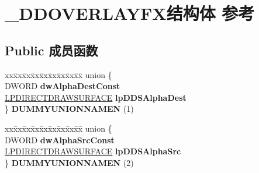 \hypertarget{struct___d_d_o_v_e_r_l_a_y_f_x}{}\section{\+\_\+\+D\+D\+O\+V\+E\+R\+L\+A\+Y\+F\+X结构体 参考}
\label{struct___d_d_o_v_e_r_l_a_y_f_x}
\subsection*{Public 成员函数}
\begin{DoxyCompactItemize}
\item 
\mbox{\label{struct___d_d_o_v_e_r_l_a_y_f_x_a41746edd5a33cf3b72858abd52d56ea8}} 
\begin{tabbing}
xx\=xx\=xx\=xx\=xx\=xx\=xx\=xx\=xx\=\kill
union \{\\
\>DWORD {\bfseries dwAlphaDestConst}\\
\>\hyperlink{interfacevoid}{LPDIRECTDRAWSURFACE} {\bfseries lpDDSAlphaDest}\\
\} {\bfseries DUMMYUNIONNAMEN} (1)\\

\end{tabbing}\item 
\mbox{\label{struct___d_d_o_v_e_r_l_a_y_f_x_a596f7ed0665fa9f1b595ec2e0f687f27}} 
\begin{tabbing}
xx\=xx\=xx\=xx\=xx\=xx\=xx\=xx\=xx\=\kill
union \{\\
\>DWORD {\bfseries dwAlphaSrcConst}\\
\>\hyperlink{interfacevoid}{LPDIRECTDRAWSURFACE} {\bfseries lpDDSAlphaSrc}\\
\} {\bfseries DUMMYUNIONNAMEN} (2)\\

\end{tabbing}\end{DoxyCompactItemize}
